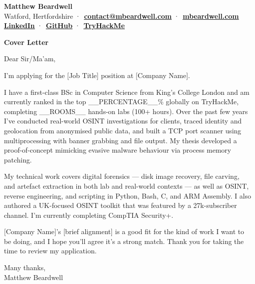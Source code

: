 \documentclass[10pt,a4paper]{article}
\newcommand{\paragap}{0.20em}
\newcommand{\headermargin}{0.00em}
\newcommand{\setfontsize}[2]{\fontsize{#1}{#1}\selectfont{}#2}
\newcommand{\textcolorbf}[1]{\textbf{\textcolor{surface}{#1}}}
\newcommand{\cvlink}[2]{\uline{\href{#1}{\textcolor{surface}{\textbf{#2}}}}}
\newenvironment{cvsection}[1]{
  \begin{tcolorbox}[
    colback=accent!25,
    boxrule=0pt,
    colframe=white,
    left=4pt,
    right=4pt,
    top=2pt,
    bottom=2pt,
    sharp corners=all,
    coltext=surface
  ]
    \textcolorbf{#1}
  \end{tcolorbox}
  \vspace{\headermargin}
}
{\vspace{\headermargin}}
\begin{document}
\begin{flushleft}
  {{\setfontsize{26pt}{\textcolorbf{Matthew Beardwell}}}} \\[1.1em]
  Watford, Hertfordshire ·\
  \cvlink{mailto:contact@mbeardwell.com}{contact@mbeardwell.com} ·\
  \cvlink{https://mbeardwell.com}{mbeardwell.com} \\
  \vspace{\paragap}
  \cvlink{https://linkedin.com/in/mbeardwell}{LinkedIn} ·\
  \cvlink{https://github.com/mbeardwell}{GitHub} ·\
  \cvlink{https://tryhackme.com/p/mbeardwell}{TryHackMe}
\end{flushleft}

\begin{cvsection}{Cover Letter}
{\renewcommand{\paragap}{0.50em}\setlength{\parskip}{\paragap}
Dear Sir/Ma'am,

I’m applying for the [Job Title] position at [Company Name].

I have a first-class BSc in Computer Science from King's College London and am currently ranked in the top 
__PERCENTAGE__\% globally on TryHackMe, completing __ROOMS__ hands-on labs (100+ hours). Over the past 
few years I've conducted real-world OSINT investigations for clients, traced identity and geolocation from 
anonymised public data, and built a TCP port scanner using multiprocessing with banner grabbing and file output. 
My thesis developed a proof-of-concept mimicking evasive malware behaviour via process memory patching.

My technical work covers digital forensics — disk image recovery, file carving, and artefact extraction in both lab and real-world contexts 
— as well as OSINT, reverse engineering, and scripting in Python, Bash, C, and ARM Assembly. I also authored a UK-focused OSINT toolkit 
that was featured by a 27k-subscriber channel. I'm currently completing CompTIA Security+.

[Company Name]'s [brief alignment] is a good fit for the kind of work I want to be doing, and I hope you'll agree it's a strong match. 
Thank you for taking the time to review my application.

Many thanks,\\
Matthew Beardwell
}
\end{cvsection}
\end{document}

